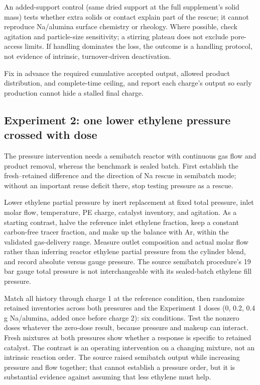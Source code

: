 An added-support control (same dried support at the full supplement's solid mass) tests whether extra solids or contact explain part of the rescue; it cannot reproduce Na/alumina surface chemistry or rheology. Where possible, check agitation and particle-size sensitivity; a stirring plateau does not exclude pore-access limits. If handling dominates the loss, the outcome is a handling protocol, not evidence of intrinsic, turnover-driven deactivation.

Fix in advance the required cumulative accepted output, allowed product distribution, and complete-time ceiling, and report each charge's output so early production cannot hide a stalled final charge.

\subsection{Experiment 2: one lower ethylene pressure crossed with dose}

The pressure intervention needs a semibatch reactor with continuous gas flow and product removal, whereas the benchmark is sealed batch. First establish the fresh--retained difference and the direction of Na rescue in semibatch mode; without an important reuse deficit there, stop testing pressure as a rescue.

Lower ethylene partial pressure by inert replacement at fixed total pressure, inlet molar flow, temperature, PE charge, catalyst inventory, and agitation. As a starting contrast, halve the reference inlet ethylene fraction, keep a constant carbon-free tracer fraction, and make up the balance with Ar, within the validated gas-delivery range. Measure outlet composition and actual molar flow rather than inferring reactor ethylene partial pressure from the cylinder blend, and record absolute versus gauge pressure. The source semibatch procedure's 19\,bar gauge total pressure is not interchangeable with its sealed-batch ethylene fill pressure.\cite{conk2024si}

Match all history through charge 1 at the reference condition, then randomize retained inventories across both pressures and the Experiment 1 doses (0, 0.2, 0.4\,g Na/alumina, added once before charge 2): six conditions. Test the nonzero doses whatever the zero-dose result, because pressure and makeup can interact. Fresh mixtures at both pressures show whether a response is specific to retained catalyst. The contrast is an operating intervention on a changing mixture, not an intrinsic reaction order. The source raised semibatch output while increasing pressure and flow together; that cannot establish a pressure order, but it is substantial evidence against assuming that less ethylene must help.\cite{conk2024}

